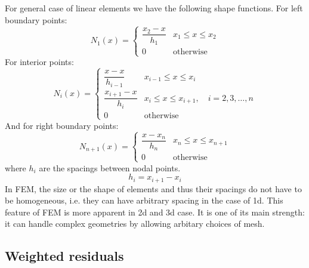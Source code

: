 \documentclass[a4paper,12pt]{article} %
\begin{document}
For general case of linear elements we have the following shape functions. For left
boundary points:
\begin{equation}
N_{1}(x) = \begin{cases}
\dfrac{x_{2} - x}{h_1} & x_{1} \leq x \leq x_{2} \\[10pt]
0                     & \text{otherwise}
\end{cases}
\end{equation}
%
For interior points:
%
\begin{equation}
N_{i}(x) = \begin{cases}
\dfrac{x - x}{h_{i-1}} & x_{i-1} \leq x \leq x_{i} \\[10pt]
\dfrac{x_{i+1} - x}{h_{i}} & x_{i} \leq x \leq x_{i+1},\quad i=2,3,\ldots,n \\[10pt]
0                     & \text{otherwise}
\end{cases}
\end{equation}
%
And for right boundary points:
%
\begin{equation}
N_{n+1}(x) = \begin{cases}
\dfrac{x - x_{n}}{h_{n}} & x_{n} \leq x \leq x_{n+1} \\[10pt]
0                     & \text{otherwise}
\end{cases}
\end{equation}
%
where $h_{i}$ are the spacings between nodal points.
%
\begin{equation}
h_{i} = x_{i+1} - x_{i}
\end{equation}
%
In FEM, the size or the shape of elements and thus their
spacings do not have to be homogeneous, i.e. they can have arbitrary spacing
in the case of 1d.
This feature of FEM is more apparent in 2d and 3d case.
It is one of its main strength: it can handle
complex geometries by allowing arbitary choices of mesh.

\subsection{Weighted residuals}
\end{document}

